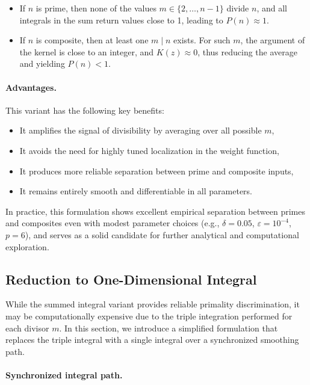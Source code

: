 \documentclass[12pt]{article}
\theoremstyle{definition}
\theoremstyle{plain}
\theoremstyle{remark}
\begin{document}
\begin{itemize}
  \item If \( n \) is prime, then none of the values \( m \in \{2, \dots, n-1\} \) divide \( n \), and all integrals in the sum return values close to 1, leading to \( P(n) \approx 1 \).
  \item If \( n \) is composite, then at least one \( m \mid n \) exists. For such \( m \), the argument of the kernel is close to an integer, and \( K(z) \approx 0 \), thus reducing the average and yielding \( P(n) < 1 \).
\end{itemize}

\paragraph{Advantages.}

This variant has the following key benefits:
\begin{itemize}
  \item It amplifies the signal of divisibility by averaging over all possible \( m \),
  \item It avoids the need for highly tuned localization in the weight function,
  \item It produces more reliable separation between prime and composite inputs,
  \item It remains entirely smooth and differentiable in all parameters.
\end{itemize}

In practice, this formulation shows excellent empirical separation between primes and composites even with modest parameter choices (e.g., \( \delta = 0.05 \), \( \varepsilon = 10^{-4} \), \( p = 6 \)), and serves as a solid candidate for further analytical and computational exploration.

\subsection{Reduction to One-Dimensional Integral}

While the summed integral variant provides reliable primality discrimination, it may be computationally expensive due to the triple integration performed for each divisor \( m \). In this section, we introduce a simplified formulation that replaces the triple integral with a single integral over a synchronized smoothing path.

\paragraph{Synchronized integral path.}
\end{document}
